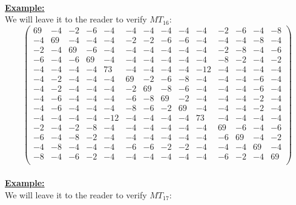 \documentclass[11pt]{article}
\theoremstyle{plain}
\theoremstyle{definition}
\begin{document}
\\
\textbf{\underline{Example:}} \\
We will leave it to the reader to verify $MT_{16}$:
\[\left(
\begin{array}{cccccccccccccc}
	69 & -4 & -2 & -6 & -4 & -4 & -4 & -4 & -4 & -4 & -2 & -6 & -4 & -8 \\
	-4 & 69 & -4 & -4 & -4 & -2 & -2 & -6 & -6 & -4 & -4 & -4 & -8 & -4 \\
	-2 & -4 & 69 & -6 & -4 & -4 & -4 & -4 & -4 & -4 & -2 & -8 & -4 & -6 \\
	-6 & -4 & -6 & 69 & -4 & -4 & -4 & -4 & -4 & -4 & -8 & -2 & -4 & -2 \\
	-4 & -4 & -4 & -4 & 73 & -4 & -4 & -4 & -4 & -12 & -4 & -4 & -4 & -4 \\
	-4 & -2 & -4 & -4 & -4 & 69 & -2 & -6 & -8 & -4 & -4 & -4 & -6 & -4 \\
	-4 & -2 & -4 & -4 & -4 & -2 & 69 & -8 & -6 & -4 & -4 & -4 & -6 & -4 \\
	-4 & -6 & -4 & -4 & -4 & -6 & -8 & 69 & -2 & -4 & -4 & -4 & -2 & -4 \\
	-4 & -6 & -4 & -4 & -4 & -8 & -6 & -2 & 69 & -4 & -4 & -4 & -2 & -4 \\
	-4 & -4 & -4 & -4 & -12 & -4 & -4 & -4 & -4 & 73 & -4 & -4 & -4 & -4 \\
	-2 & -4 & -2 & -8 & -4 & -4 & -4 & -4 & -4 & -4 & 69 & -6 & -4 & -6 \\
	-6 & -4 & -8 & -2 & -4 & -4 & -4 & -4 & -4 & -4 & -6 & 69 & -4 & -2 \\
	-4 & -8 & -4 & -4 & -4 & -6 & -6 & -2 & -2 & -4 & -4 & -4 & 69 & -4 \\
	-8 & -4 & -6 & -2 & -4 & -4 & -4 & -4 & -4 & -4 & -6 & -2 & -4 & 69 \\
\end{array}
\right)\]
\\
\textbf{\underline{Example:}} \\
We will leave it to the reader to verify $MT_{17}$:
\end{document}
